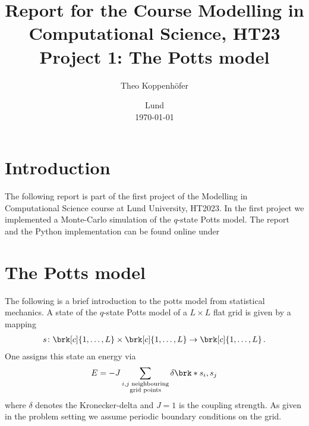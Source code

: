 




\title{ Report for the Course Modelling in Computational Science, HT23 \\[1ex]
	  \large Project 1: The Potts model}
\author{Theo Koppenhöfer}
\date{Lund \\[1ex] \today}



\usepackage{pythonhighlight}
\usepackage{pgfplots}
\graphicspath{{../Figures/}}






\maketitle

\section{Introduction}

The following report is part of the first project of the Modelling in Computational Science course at Lund University, HT2023.
In the first project we implemented a Monte-Carlo simulation of the $q$-state Potts model.
The report and the Python implementation can be found online under \cite{Repository}

\section{The Potts model}

The following is a brief introduction to the potts model from statistical mechanics.
A state of the $q$-state Potts model of a $L\times L$ flat grid is given by a mapping
\begin{align*}
	s\colon \brk[c]{1,\dots,L}\times\brk[c]{1,\dots,L}\to\brk[c]{1,\dots,L}\,.
\end{align*}
One assigns this state an energy via
\begin{align*}
	E = -J\sum_{\substack{i, j\text{ neighbouring}\\ \text{grid points}}}\delta\brk*{s_i,s_j}
\end{align*}
where $\delta$ denotes the Kronecker-delta and $J=1$ is the coupling strength. As given in the problem setting we assume periodic boundary conditions on the grid.

